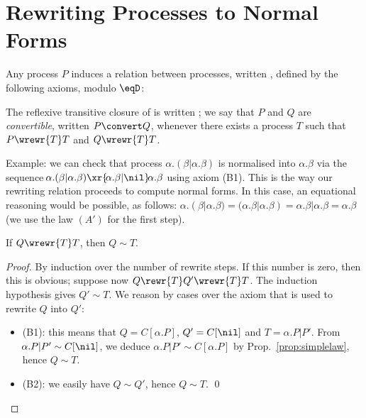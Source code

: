 \documentclass{llncs}
\begin{document}
\section{Rewriting Processes to Normal Forms}
\label{sec:rwt}



\begin{defi}\label{def:rewr:conv}
  Any process $P$ induces a relation between processes, written
  , defined by the following axioms, modulo $\eqD$:
The reflexive transitive closure of  is written ;
we say that $P$ and $Q$ are \emph{convertible}, written $P\convert Q$,
whenever there exists a process $T$ such that $P\wrewr{T}T$ and
$Q\wrewr{T}T$.
\end{defi}

Example: we can check that process $\!\alpha.(\beta|\alpha.\beta)$ is
normalised into $\!\alpha.\beta$ via the sequence
$\!\alpha.(\beta|\alpha.\beta) \xr{\!\alpha.\beta|\nil}\!\alpha.\beta$
using axiom (B1). This is the way our rewriting relation proceeds to
compute normal forms. In this case, an equational reasoning would be
possible, as follows: $\!\alpha.(\beta|\alpha.\beta) =
\!(\alpha.\beta|\alpha.\beta) = \!\alpha.\beta |\!\alpha.\beta =
\!\alpha.\beta$ (we use the law $(A')$ for the first step).

\begin{lem}\label{lem:rewr:TT}
  If $Q\wrewr{T}T$, then $Q\sim T$.
\end{lem}
\begin{proof}
  By induction over the number of rewrite steps. If this number is
  zero, then this is obvious; suppose now $Q\rewr{T}Q'\wrewr{T}T$. The
  induction hypothesis gives $Q'\sim T$. We reason by cases over the
  axiom that is used to rewrite $Q$ into $Q'$:
\begin{itemize}
  \item (B1): this means that $Q = C[\alpha.P]$, $Q' = C[\nil]$
    and $T=\!\alpha.P|P'$. From $\!\alpha.P|P'\sim C[\nil]$, we deduce
    $\!\alpha.P|P' \sim C[\alpha.P]$ by Prop.~\ref{prop:simplelaw},
    hence $Q\sim T$.
  \item (B2): we easily have $Q\sim Q'$, hence $Q\sim T$.
    \qed
  \end{itemize}
\end{proof}
\end{document}
